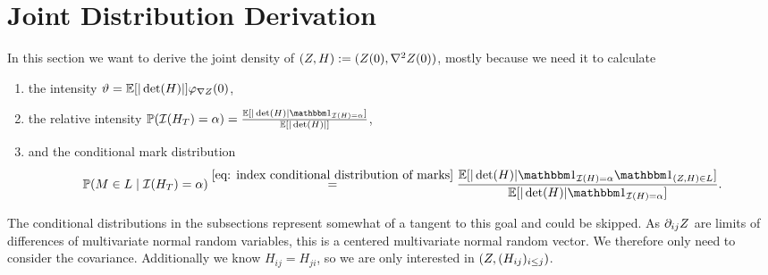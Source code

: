 \section{Joint Distribution Derivation}


In this section we want to derive the joint density of \((Z, H):=
(Z(0), \nabla^2Z(0))\), mostly because we need it to calculate
\begin{enumerate}
	\item the intensity \(\vartheta = \mathbb{E}[|\det(H)|]\varphi_{\nabla Z}(0)\),
	\item the relative intensity \(\Pr(\negEV(H_T) = \alpha) =
	\frac{\E[|\det(H)|\ind_{\negEV(H)=\alpha}]}{\E[|\det(H)|]} \),
	\item and the conditional mark distribution
	\[
		\Pr(\Mark\in L\mid \negEV(H_T) = \alpha)
		\overset{\eqref{eq: index conditional distribution of marks}}= \frac{
			\E[|\det(H)|\ind_{\negEV(H) = \alpha}\ind_{(Z,H)\in L}]
		}{\E[|\det(H)|\ind_{\negEV(H) = \alpha}]}.
	\]
\end{enumerate}
The conditional distributions in the subsections represent somewhat of a
tangent to this goal and could be skipped.
As \(\partial_{ij}Z\) are limits of differences of multivariate
normal random variables, this is a centered multivariate normal
random vector. We therefore only need to consider the covariance. Additionally
we know \(H_{ij} = H_{ji}\), so we are only interested
in \((Z, (H_{ij})_{i\le j})\).


